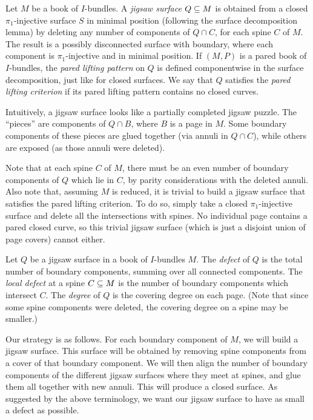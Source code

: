 \begin{defn}

Let $M$ be a book of $I$-bundles. A \emph{jigsaw surface} $Q \subseteq
M$ is obtained from a closed $\pi_1$-injective surface $S$ in minimal position
(following the surface decomposition lemma) by deleting any number of
components of $Q \cap C$, for each spine $C$ of $M$. The result is a possibly
disconnected surface with boundary, where each component is $\pi_1$-injective
and in minimal position. If $(M,P)$ is a pared book of $I$-bundles, the
\emph{pared lifting pattern} on $Q$ is defined componentwise in the surface
decomposition, just like for closed surfaces. We say that $Q$ satisfies the
\emph{pared lifting criterion} if its pared lifting pattern contains no closed
curves.

\end{defn}

Intuitively, a jigsaw surface looks like a partially completed jigsaw puzzle.
The ``pieces'' are components of $Q \cap B$, where $B$ is a page in $M$.  Some
boundary components of these pieces are glued together (via annuli in $Q \cap
C$), while others are exposed (as those annuli were deleted).

Note that at each spine $C$ of $M$, there must be an even number of boundary
components of $Q$ which lie in $C$, by parity considerations with the deleted
annuli. Also note that, assuming $M$ is reduced, it is trivial to build
a jigsaw surface that satisfies the pared lifting criterion. To
do so, simply take a closed $\pi_1$-injective surface and delete all the
intersections with spines.  No individual page contains a pared closed curve,
so this trivial jigsaw surface (which is just a disjoint union of
page covers) cannot either.

\begin{defn}

Let $Q$ be a jigsaw surface in a book of $I$-bundles $M$. The
\emph{defect} of $Q$ is the total number of boundary components, summing over
all connected components. The \emph{local defect} at a spine $C \subseteq M$ is the
number of boundary components which intersect $C$. The \emph{degree} of $Q$ is
the covering degree on each page. (Note that since some spine components were
deleted, the covering degree on a spine may be smaller.)

\end{defn}

Our strategy is as follows. For each boundary component of $M$, we will build
a jigsaw surface. This surface will be obtained by removing spine
components from a cover of that boundary component. We will then align the
number of boundary components of the different jigsaw surfaces
where they meet at spines, and glue them all together with new annuli. This
will produce a closed surface. As suggested by the above terminology, we want
our jigsaw surface to have as small a defect as possible.


